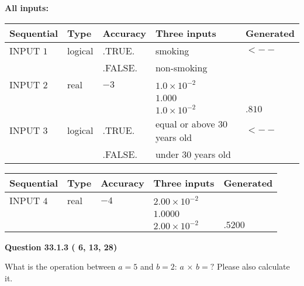 \documentclass[12pt]{article}
\begin{document}
   
   
   
\noindent\vspace{0.1in}\hspace{-0.08in} {\textbf{\Large{All inputs: }}}
   
   
  
  
\noindent\begin{tabular}{|l|l|l|l|l|}
\hline
 Sequential & Type & Accuracy & Three inputs & Generated \\ 
\hline
 
 
  INPUT $           1$ & logical & .TRUE. & 
 smoking & 
  $ <-- $ 
  \\
  & & .FALSE. & 
  non-smoking & 
 \\  \hline  
 
 
  INPUT $           2$ & real & $          -3 $ & $
 1.0 \times 10^{-2}
  $ & \\
  & & &  $
 1.000
  $ & \\
  & & &  $
 1.0 \times 10^{-2}
 $ & $ .810 $ 
 \\  \hline  
 
 
  INPUT $           3$ & logical & .TRUE. & 
 equal or above 30 years old & 
  $ <-- $ 
  \\
  & & .FALSE. & 
  under 30 years old & 
 \\  \hline  
 \end{tabular}
   
   
  
  
\noindent\begin{tabular}{|l|l|l|l|l|}
\hline
 Sequential & Type & Accuracy & Three inputs & Generated \\ 
\hline
 
 
  INPUT $           4$ & real & $          -4 $ & $
 2.00 \times 10^{-2}
  $ & \\
  & & &  $
 1.0000
  $ & \\
  & & &  $
 2.00 \times 10^{-2}
 $ & $ .5200 $ 
 \\  \hline  
 \end{tabular}
   
   
  
\vspace{0.2in}
  
{\textbf{\Large{Question
33.1.3 
 (          6,         13,         28)
}}}
  
  
What is the operation between $a= %
5$ and $b= %
2$:
$a$  %
$\times$ $b=?$ Please also calculate it.
 
 
\noindent{}
 
\end{document}
